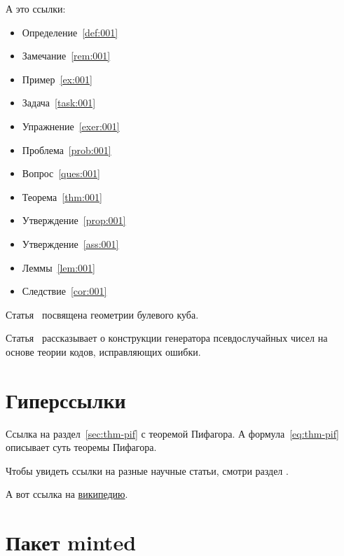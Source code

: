 \documentclass[colorthm]{../civarticle}
\begin{document}
\begin{assertion*}
  \Blindtext[2]
\end{assertion*}

\begin{corollary}
  \label{cor:001}
  \Blindtext[2]
\end{corollary}

\begin{corollary*}
  \Blindtext[2]
\end{corollary*}

\begin{lemma}
  \label{lem:001}
  \Blindtext[2]
\end{lemma}

\begin{lemma*}
  \Blindtext[2]
\end{lemma*}

А это ссылки:

\begin{itemize}
\item Определение~\ref{def:001}
\item Замечание~\ref{rem:001}
\item Пример~\ref{ex:001}
\item Задача~\ref{task:001}
\item Упражнение~\ref{exer:001}
\item Проблема~\ref{prob:001}
\item Вопрос~\ref{ques:001}
\item Теорема~\ref{thm:001}
\item Утверждение~\ref{prop:001}
\item Утверждение~\ref{ass:001}
\item Леммы~\ref{lem:001}
\item Следствие~\ref{cor:001}
\end{itemize}

Статья~\cite{ahlswede1977} посвящена геометрии булевого куба.

Статья~\cite{ahmed2013} рассказывает о конструкции генератора
псевдослучайных чисел на основе теории кодов, исправляющих ошибки.


\section{Гиперссылки}
\label{sec:hyper}

Ссылка на раздел~\ref{sec:thm-pif} с теоремой Пифагора.  А
формула~\eqref{eq:thm-pif} описывает суть теоремы Пифагора.

Чтобы увидеть ссылки на разные научные статьи, смотри раздел
\hyperref[sec:ref-to-articles]{}.

А вот ссылка на \href{https://ru.wikipedia.org}{википедию}.


\section{Пакет minted}
\label{sec:minted}
\if \MINTED\empty
\else \inputminted{python}{code.py} \fi
\end{document}
